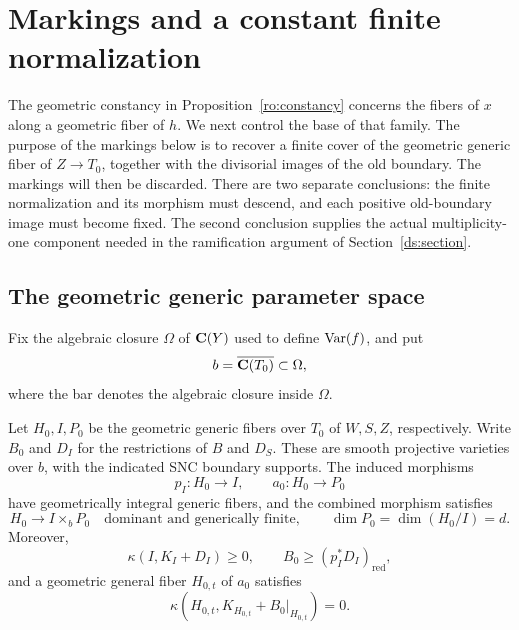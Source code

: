 \section{Markings and a constant finite normalization}
\label{sec:marking}

The geometric constancy in Proposition~\ref{ro:constancy} concerns the
fibers of $x$ along a geometric fiber of $h$.  We next control the base of
that family.  The purpose of the markings below is to recover a
finite cover of the geometric generic fiber of $Z\to T_0$, together
with the divisorial images of the old boundary.  The markings will then be discarded. There are two separate
conclusions: the finite normalization and its morphism must descend,
and each positive old-boundary image must become fixed. The second
conclusion supplies the actual multiplicity-one component needed in
the ramification argument of Section~\ref{ds:section}.

\subsection{The geometric generic parameter space}

Fix the algebraic closure $\Omega$ of $\mathbf C(Y)$ used to define
$\operatorname{Var}(f)$, and put
\[
 b=\overline{\mathbf C(T_0)}\subset\Omega,
\]
where the bar denotes the algebraic closure inside $\Omega$.

\begin{lemma}\label{mk:setup}
Let $H_0,I,P_0$ be the geometric generic fibers over $T_0$ of $W,S,Z$,
respectively.  Write $B_0$ and $D_I$ for the restrictions of $B$ and
$D_S$.  These are smooth projective varieties over $b$, with the indicated
SNC boundary supports.  The induced morphisms
\[
 p_I:H_0\longrightarrow I,\qquad a_0:H_0\longrightarrow P_0
\]
have geometrically integral generic fibers, and the combined morphism
satisfies
\begin{equation}\label{mk:generic-diagram}
 H_0\longrightarrow I\times_b P_0
 \quad\text{dominant and generically finite},\qquad
 \dim P_0=\dim(H_0/I)=d.
\end{equation}
Moreover,
\begin{equation}\label{mk:log-base}
 \kappa(I,K_I+D_I)\geq0,
 \qquad B_0\geq(p_I^*D_I)_{\mathrm{red}},
\end{equation}
and a geometric general fiber $H_{0,t}$ of $a_0$ satisfies
\begin{equation}\label{mk:zero-fiber}
 \kappa(H_{0,t},K_{H_{0,t}}+B_0|_{H_{0,t}})=0.
\end{equation}
\end{lemma}

